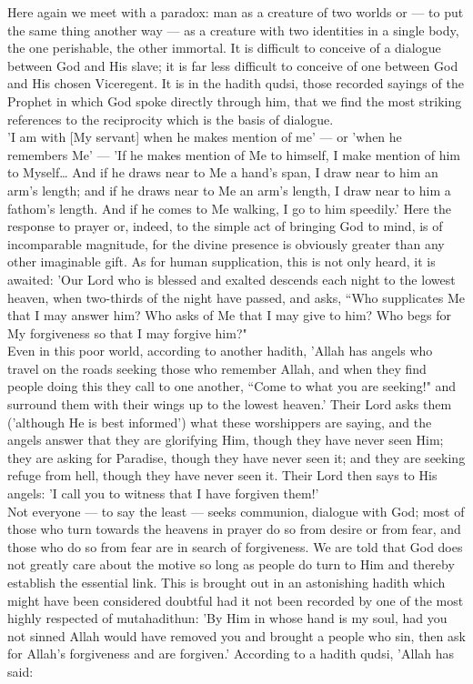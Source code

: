 \documentclass[10pt, twoside]{book}
\begin{document}
Here again we meet with a paradox: man as a creature of two worlds or --- to put the same thing another 
way --- as a creature with two identities in a single body, the one perishable, the other immortal. It 
is difficult to conceive of a dialogue between God and His slave; it is far less difficult to 
conceive of one between God and His chosen Viceregent. It is in the hadith qudsi, those recorded 
sayings of the Prophet in which God spoke directly through him, that we find the most striking 
references to the reciprocity which is the basis of dialogue. \\

'I am with [My servant] when he makes mention of me' --- or 'when he remembers Me' --- 'If he makes 
mention of Me to himself, I make mention of him to Myself\ldots{} And if he draws near to Me a hand's 
span, I draw near to him an arm's length; and if he draws near to Me an arm's length, I draw near to 
him a fathom's length. And if he comes to Me walking, I go to him speedily.' Here the response to 
prayer or, indeed, to the simple act of bringing God to mind, is of incomparable magnitude, for the 
divine presence is obviously greater than any other imaginable gift. As for human supplication, this 
is not only heard, it is awaited: 'Our Lord who is blessed and exalted descends each night to the 
lowest heaven, when two\hyp{}thirds of the night have passed, and asks, ``Who supplicates Me that I may 
answer him? Who asks of Me that I may give to him? Who begs for My forgiveness so that I may forgive 
him?" \\

Even in this poor world, according to another hadith, 'Allah has angels who travel on the roads 
seeking those who remember Allah, and when they find people doing this they call to one another, 
``Come to what you are seeking!" and surround them with their wings up to the lowest heaven.' Their 
Lord asks them ('although He is best informed') what these worshippers are saying, and the angels 
answer that they are glorifying Him, though they have never seen Him; they are asking for Paradise, 
though they have never seen it; and they are seeking refuge from hell, though they have never seen 
it. Their Lord then says to His angels: 'I call you to witness that I have forgiven them!' \\

Not everyone --- to say the least --- seeks communion, dialogue with God; most of those who turn towards 
the heavens in prayer do so from desire or from fear, and those who do so from fear are in search of 
forgiveness. We are told that God does not greatly care about the motive so long as people do turn to 
Him and thereby establish the essential link. This is brought out in an astonishing hadith which 
might have been considered doubtful had it not been recorded by one of the most highly respected of 
mutahadithun: 'By Him in whose hand is my soul, had you not sinned Allah would have removed you and 
brought a people who sin, then ask for Allah's forgiveness and are forgiven.' According to a hadith 
qudsi, 'Allah has said: \\
\end{document}
